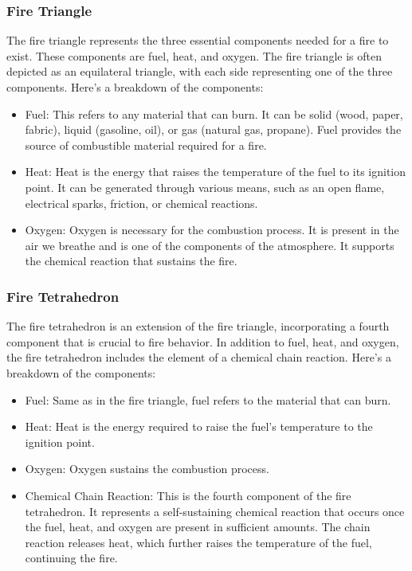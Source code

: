 \documentclass{article}
\begin{document}
\subsubsection*{Fire Triangle}
The fire triangle represents the three essential components needed for a fire to exist. These components are fuel, heat, and oxygen. The fire triangle is often depicted as an equilateral triangle, with each side representing one of the three components. Here's a breakdown of the components:
\begin{itemize}
  \item Fuel: This refers to any material that can burn. It can be solid (wood, paper, fabric), liquid (gasoline, oil), or gas (natural gas, propane). Fuel provides the source of combustible material required for a fire.
  \item Heat: Heat is the energy that raises the temperature of the fuel to its ignition point. It can be generated through various means, such as an open flame, electrical sparks, friction, or chemical reactions.
  \item Oxygen: Oxygen is necessary for the combustion process. It is present in the air we breathe and is one of the components of the atmosphere. It supports the chemical reaction that sustains the fire.
\end{itemize}


\subsubsection*{Fire Tetrahedron} 
The fire tetrahedron is an extension of the fire triangle, incorporating a fourth component that is crucial to fire behavior. In addition to fuel, heat, and oxygen, the fire tetrahedron includes the element of a chemical chain reaction. Here's a breakdown of the components:
\begin{itemize}
  \item Fuel: Same as in the fire triangle, fuel refers to the material that can burn.
  \item Heat: Heat is the energy required to raise the fuel's temperature to the ignition point.
  \item Oxygen: Oxygen sustains the combustion process.
  \item Chemical Chain Reaction: This is the fourth component of the fire tetrahedron. It represents a self-sustaining chemical reaction that occurs once the fuel, heat, and oxygen are present in sufficient amounts. The chain reaction releases heat, which further raises the temperature of the fuel, continuing the fire.
\end{itemize}
\end{document}
